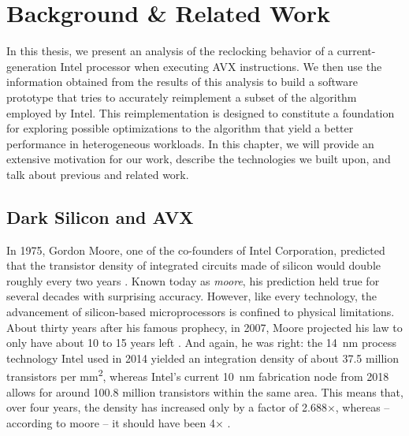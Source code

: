 \chapter{Background \& Related Work}
\label{sec:background}

In this thesis, we present an analysis of the reclocking behavior of a current-generation Intel processor when executing \gls{AVX} instructions. We then use the information obtained from the results of this analysis to build a software prototype that tries to accurately reimplement a subset of the algorithm employed by Intel. This reimplementation is designed to constitute a foundation for exploring possible optimizations to the algorithm that yield a better performance in heterogeneous workloads. In this chapter, we will provide an extensive motivation for our work, describe the technologies we built upon, and talk about previous and related work.

\section{Dark Silicon and AVX}
\label{sec:background:motivation}

In 1975, Gordon Moore, one of the co-founders of Intel Corporation, predicted that the transistor density of integrated circuits made of silicon would double roughly every two years \cite{moore1975progress}. Known today as \emph{\gls{moore}}, his prediction held true for several decades with surprising accuracy. However, like every technology, the advancement of silicon-based microprocessors is confined to physical limitations. About thirty years after his famous prophecy, in 2007, Moore projected his law to only have about 10 to 15 years left \cite{moore2007interview}. And again, he was right: the \SI{14}{\nano\meter} process technology Intel used in 2014 yielded an integration density of about 37.5 million transistors per \si{\milli\meter\squared}, whereas Intel's current \SI{10}{\nano\meter} fabrication node from 2018 allows for around 100.8 million transistors within the same area. This means that, over four years, the density has increased only by a factor of 2.688$\times$, whereas -- according to \gls{moore} -- it should have been 4$\times$ \cite{courtland2017intel}.

